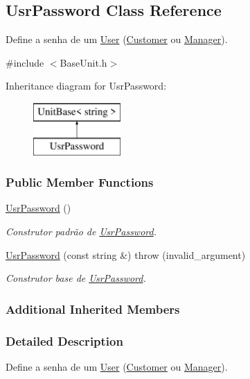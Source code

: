 \hypertarget{classUsrPassword}{\subsection{Usr\-Password Class Reference}
\label{d9/d39/classUsrPassword}
}


Define a senha de um \hyperlink{classUser}{User} (\hyperlink{classCustomer}{Customer} ou \hyperlink{classManager}{Manager}).  




{\ttfamily \#include $<$Base\-Unit.\-h$>$}

Inheritance diagram for Usr\-Password\-:\begin{figure}[H]
\begin{center}
\leavevmode
\includegraphics[height=2.000000cm]{d9/d39/classUsrPassword}
\end{center}
\end{figure}
\subsubsection*{Public Member Functions}
\begin{DoxyCompactItemize}
\item 
\hyperlink{classUsrPassword_ab86dc59f9c9ba2325342c4dfc8f243d6}{Usr\-Password} ()
\begin{DoxyCompactList}\small\item\em Construtor padrão de \hyperlink{classUsrPassword}{Usr\-Password}. \end{DoxyCompactList}\item 
\hyperlink{classUsrPassword_ab99c93719778f9560712675b1febb3cb}{Usr\-Password} (const string \&)  throw (invalid\-\_\-argument)
\begin{DoxyCompactList}\small\item\em Construtor base de \hyperlink{classUsrPassword}{Usr\-Password}. \end{DoxyCompactList}\end{DoxyCompactItemize}
\subsubsection*{Additional Inherited Members}


\subsubsection{Detailed Description}
Define a senha de um \hyperlink{classUser}{User} (\hyperlink{classCustomer}{Customer} ou \hyperlink{classManager}{Manager}). 

